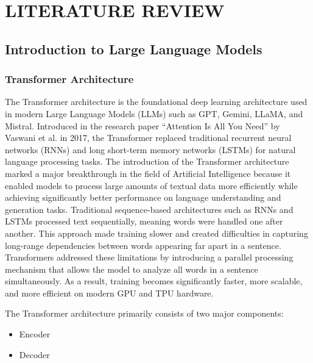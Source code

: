 \documentclass[12pt, a4paper, onecolumn]{report}
\begin{document}
\chapter{LITERATURE REVIEW}

\section{Introduction to Large Language Models}
\subsection{Transformer Architecture}

The Transformer architecture is the foundational deep learning architecture used in modern Large Language Models (LLMs) such as GPT, Gemini, LLaMA, and Mistral. Introduced in the research paper “Attention Is All You Need” by Vaswani et al. in 2017, the Transformer replaced traditional recurrent neural networks (RNNs) and long short-term memory networks (LSTMs) for natural language processing tasks. The introduction of the Transformer architecture marked a major breakthrough in the field of Artificial Intelligence because it enabled models to process large amounts of textual data more efficiently while achieving significantly better performance on language understanding and generation tasks. Traditional sequence-based architectures such as RNNs and LSTMs processed text sequentially, meaning words were handled one after another. This approach made training slower and created difficulties in capturing long-range dependencies between words appearing far apart in a sentence. Transformers addressed these limitations by introducing a parallel processing mechanism that allows the model to analyze all words in a sentence simultaneously. As a result, training becomes significantly faster, more scalable, and more efficient on modern GPU and TPU hardware.

The Transformer architecture primarily consists of two major components:

\begin{itemize}
    \item Encoder
    \item Decoder
\end{itemize}
\end{document}
